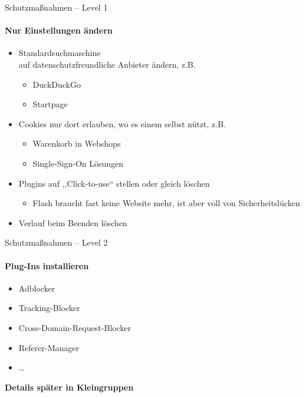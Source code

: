 \begin{frame}{Schutzmaßnahmen -- Level 1}
\framesubtitle{Nur Einstellungen ändern}
  \begin{itemize}
    \item Standardsuchmaschine\\ auf datenschutzfreundliche Anbieter ändern, z.B.
    \begin{itemize}
      \item DuckDuckGo
      \item Startpage
    \end{itemize}
    \item Cookies nur dort erlauben, wo es einem selbst nützt, z.B.
    \begin{itemize}
      \item Warenkorb in Webshops
      \item Single-Sign-On Lösungen
    \end{itemize}
    \item Plugins auf ,,Click-to-use`` stellen oder gleich löschen
    \begin{itemize}
      \item Flash braucht fast keine Website mehr, ist aber voll von Sicherheitslücken
    \end{itemize}
    \item Verlauf beim Beenden löschen
  \end{itemize}

\end{frame}

\begin{frame}{Schutzmaßnahmen -- Level 2}
\framesubtitle{Plug-Ins installieren}
  \begin{itemize}
    \item Adblocker
    \item Tracking-Blocker
    \item Cross-Domain-Request-Blocker
    \item Referer-Manager
    \item \ldots
  \end{itemize}
  \pause
  \textbf{Details später in Kleingruppen}
\end{frame}

